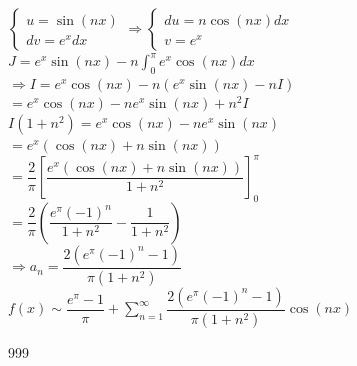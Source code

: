 \documentclass[a4paper]{article}
\begin{document}
$ \left \{
\begin{array}{l}
u=\sin(nx) \\
dv=e^xdx
\end{array}
\right .
\Rightarrow
\left \{
\begin{array}{l}
du=n\cos(nx)dx \\
v=e^x
\end{array}
\right . $\\

$J=e^x\sin(nx)-n\displaystyle\int_{0}^{\pi} e^x\cos(nx)dx$\\

$\Rightarrow I=e^x\cos(nx)-n(e^x\sin(nx)-nI)$\\

$=e^x\cos(nx)-ne^x\sin(nx)+n^2I$\\

$I(1+n^2)=e^x\cos(nx)-ne^x\sin(nx)$\\

$=e^x(\cos(nx)+n\sin(nx))$\\

$ = \dfrac{2}{\pi}\left[\dfrac{e^x(\cos(nx)+n\sin(nx))}{1+n^2}\right]_{0}^{\pi}$\\

$=\dfrac{2}{\pi}\left(\dfrac{e^{\pi}(-1)^n}{1+n^2}-\dfrac{1}{1+n^2}\right)$\\

$\Rightarrow a_n =\dfrac{2(e^{\pi}(-1)^n-1)}{\pi(1+n^2)}$\\

$f(x)\sim \dfrac{e^{\pi}-1}{\pi}+\displaystyle\sum_{n=1}^{\infty}\dfrac{2(e^{\pi}(-1)^n-1)}{\pi(1+n^2)}\cos(nx)$\\

\begin{thebibliography}{999}
\end{thebibliography}
\end{document}
